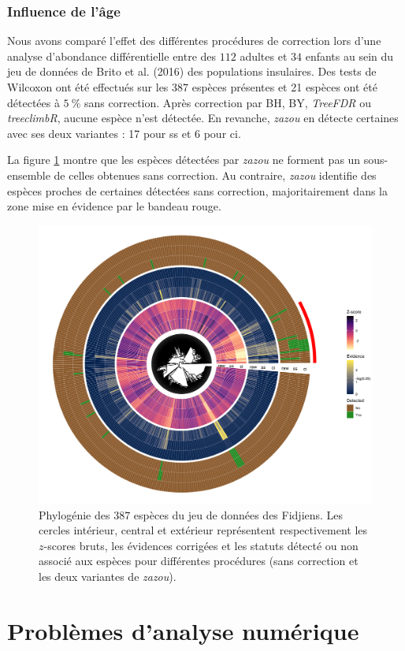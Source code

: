 \documentclass[12pt,a4paper]{reedthesis}
\theoremstyle{definition}
\theoremstyle{definition}
\theoremstyle{definition}
\theoremstyle{remark}
\begin{document}
\hypertarget{influence-de-luxe2ge}{%
\subsection{Influence de l'âge}\label{influence-de-luxe2ge}}

Nous avons comparé l'effet des différentes procédures de correction lors d'une analyse d'abondance différentielle entre des \(112\) adultes et \(34\) enfants au sein du jeu de données de Brito et al. (2016) des populations insulaires. Des tests de Wilcoxon ont été effectués sur les 387 espèces présentes et 21 espèces ont été détectées à \(5~\%\) sans correction. Après correction par BH, BY, \emph{TreeFDR} ou \emph{treeclimbR}, aucune espèce n'est détectée. En revanche, \emph{zazou} en détecte certaines avec ses deux variantes : 17 pour ss et 6 pour ci.

La figure \ref{fig:heattree} montre que les espèces détectées par \emph{zazou} ne forment pas un sous-ensemble de celles obtenues sans correction. Au contraire, \emph{zazou} identifie des espèces proches de certaines détectées sans correction, majoritairement dans la zone mise en évidence par le bandeau rouge.


\begin{figure}[!t]

{\centering \includegraphics[width=0.9\linewidth]{img/heattree} 

}

\caption{Phylogénie des \(387\) espèces du jeu de données des Fidjiens. Les cercles intérieur, central et extérieur représentent respectivement les \(z\)-scores bruts, les évidences corrigées et les statuts détecté ou non associé aux espèces pour différentes procédures (sans correction et les deux variantes de \emph{zazou}).}\label{fig:heattree}
\end{figure}
\hypertarget{ananum}{%
\chapter{Problèmes d'analyse numérique}\label{ananum}}
\end{document}
